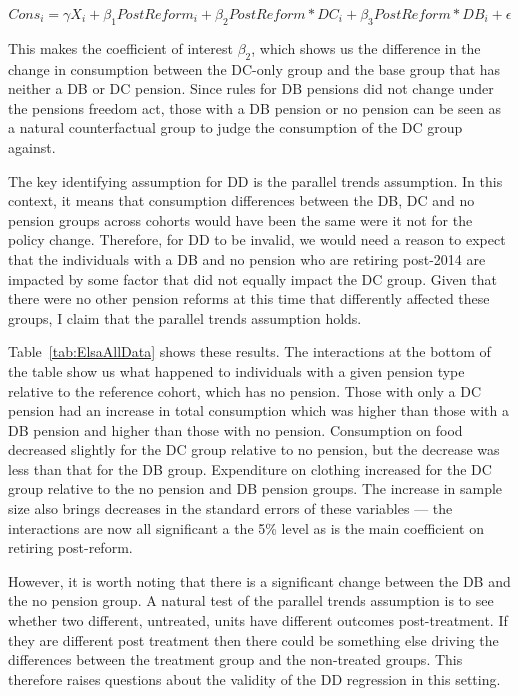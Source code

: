 \documentclass[12pt]{article}
\begin{document}
\begin{equation*}
  Cons_{i} =  \gamma X_{i} + \beta_{1} PostReform_{i} + \beta_{2} PostReform*DC_{i} + \beta_{3} PostReform*DB_{i}  + \epsilon
\end{equation*}


This makes the coefficient of interest $\beta_{2}$, which shows us the
difference in the change in consumption between the DC-only group and the base
group that has neither a DB or DC pension. Since rules for DB pensions did not
change under the pensions freedom act, those with a DB pension or no pension can
be seen as a natural counterfactual group to judge the consumption of the DC
group against.

The key identifying assumption for DD is the parallel trends assumption. In this
context, it means that consumption differences between the DB, DC and no pension
groups across cohorts would have been the same were it not for the policy change.
Therefore, for DD to be invalid, we would need a reason to expect that the
individuals with a DB and no pension who are retiring post-2014 are impacted by
some factor that did not equally impact the DC group. Given that there were no
other pension reforms at this time that differently affected these groups, I
claim that the parallel trends assumption holds.

Table~\ref{tab:ElsaAllData} shows these results. The interactions at the bottom
of the table show us what happened to individuals with a given pension type
relative to the reference cohort, which has no pension. Those with only a DC
pension had an increase in total consumption which was higher than those with a
DB pension and higher than those with no pension. Consumption on food decreased
slightly for the DC group relative to no pension, but the decrease was less than
that for the DB group. Expenditure on clothing increased for the DC group
relative to the no pension and DB pension groups. The increase in sample size
also brings decreases in the standard errors of these variables --- the
interactions are now all significant a the 5\% level as is the main coefficient
on retiring post-reform.

However, it is worth noting that there is a significant change between the DB
and the no pension group. A natural test of the parallel trends assumption is to
see whether two different, untreated, units have different outcomes
post-treatment. If they are different post treatment then there could be
something else driving the differences between the treatment group and the
non-treated groups. This therefore raises questions about the validity of the DD
regression in this setting.
\end{document}
